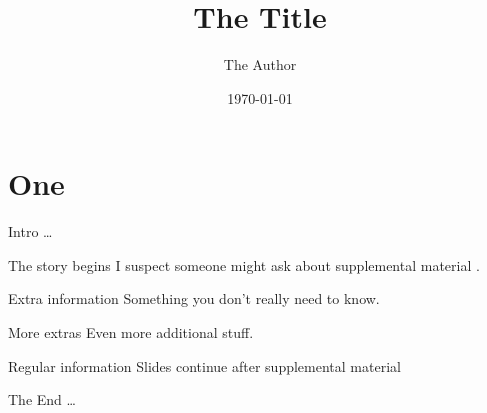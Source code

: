 \documentclass{beamer}
\title{The Title}
\author{The Author}
\date{\today}
\begin{document}
\section{One}

\begin{frame}{Intro}
  \dots
\end{frame}

\begin{frame}[label=beforesupplemental]{The story begins}
I suspect someone might ask about supplemental material
\hyperlink{supplemental}{}.
\end{frame}
\pdfpageattr{}

\begin{frame}[label=supplemental]{Extra information}
Something you don't really need to know.
\end{frame}

\begin{frame}{More extras}
Even more additional stuff.
\end{frame}

\begin{frame}[label=aftersupplemental]{Regular information}
Slides continue after supplemental material
\end{frame}
\pdfpageattr{}

\begin{frame}{The End}
\dots
\end{frame}
\end{document}
